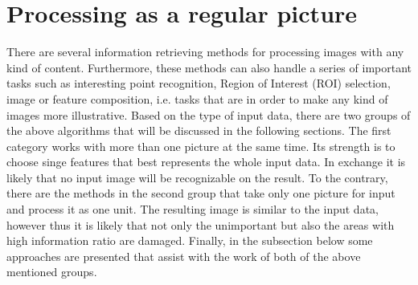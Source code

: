 \documentclass[draft,final]{vutinfth} %
\begin{document}
	\section{Processing as a regular picture}
	There are several information retrieving methods for processing images with any kind of content.
	Furthermore, these methods can also handle a series of important tasks such as interesting point recognition, Region of Interest (ROI) selection, image or feature composition, i.e. tasks that are in order to make any kind of images more illustrative.
	Based on the type of input data, there are two groups of the above algorithms that will be discussed in the following sections.
	The first category works with more than one picture at the same time.
	Its strength is to choose singe features that best represents the whole input data. 
	In exchange it is likely that no input image will be recognizable on the result.
	To the contrary, there are the methods in the second group that take only one picture for input and process it as one unit.
	The resulting image is similar to the input data, however thus it is likely that not only the unimportant but also the areas with high information ratio are damaged.
	Finally, in the subsection below some approaches are presented that assist with the work of both of the above mentioned groups.
	
\end{document}
